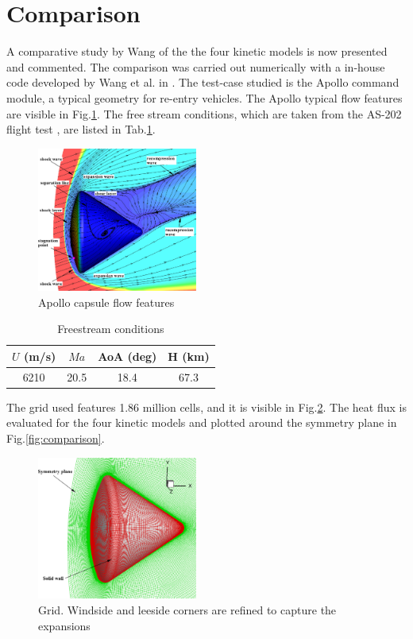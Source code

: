 \documentclass[11pt,a4paper,twocolumn]{article}
\begin{document}
\section{Comparison}
A comparative study by Wang \cite{wang2017assessment} of the the four kinetic models is now presented and commented. The comparison was carried out numerically with a in-house code developed by Wang et al. in \cite{wang2016laminar}. The test-case studied is the Apollo command module, a typical geometry for re-entry vehicles. The Apollo typical flow features are visible in Fig.\ref{fig:apollo}. The free stream conditions, which are taken from the AS-202 flight test \cite{walpot2012base}, are listed in Tab.\ref{tab:freestream}.

\begin{figure}[h]
    \centering
    \includegraphics[width=0.47\textwidth]{myimages/apollo flow features.png}
    \caption{Apollo capsule flow features}
    \label{fig:apollo}
\end{figure}

\begin{table}[h]
    \centering
    \begin{tabular}{|c|c|c|c|}
    \hline
    \hline
        $U$ (m/s) &  $Ma$ & AoA (deg)& H (km)\\
        \hline
       6210 & 20.5 & 18.4 & 67.3\\   
       \hline
       \hline
    \end{tabular}
    \caption{Freestream conditions}
    \label{tab:freestream}
\end{table}

The grid used features 1.86 million cells, and it is visible in Fig.\ref{fig:grid}. The heat flux is evaluated for the four kinetic models and plotted around the symmetry plane in Fig.\ref{fig:comparison}.

\begin{figure}[h]
    \centering
    \includegraphics[width=0.47\textwidth]{myimages/grid.png}
    \caption{Grid. Windside and leeside corners are refined to capture the expansions}
    \label{fig:grid}
\end{figure}
\end{document}
